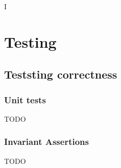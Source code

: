 I%

\chapter{Testing} %

\label{Testing} %



\section{Teststing correctness}

\subsection{Unit tests}
\color{red} TODO \color{black}

\subsection{Invariant Assertions}
\label{InvariantAssertions}
\color{red} TODO \color{black}


